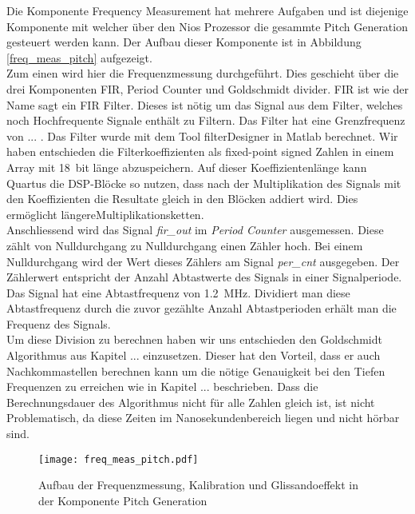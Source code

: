 Die Komponente Frequency Measurement hat mehrere Aufgaben und ist diejenige Komponente mit welcher über den Nios Prozessor die gesammte Pitch Generation gesteuert werden kann. Der Aufbau dieser Komponente ist in Abbildung \ref{freq_meas_pitch} aufgezeigt.\\
Zum einen wird hier die Frequenzmessung durchgeführt. Dies geschieht über die drei Komponenten FIR, Period Counter und Goldschmidt divider. FIR ist wie der Name sagt ein FIR Filter. Dieses ist nötig um das Signal aus dem Filter, welches noch Hochfrequente Signale enthält zu Filtern. Das Filter hat eine Grenzfrequenz von ... . Das Filter wurde mit dem Tool filterDesigner in Matlab berechnet. Wir haben entschieden die Filterkoeffizienten als fixed-point signed Zahlen in einem Array mit \SI{18}{bit} länge abzuspeichern. Auf dieser Koeffizientenlänge kann Quartus die DSP-Blöcke so nutzen, dass nach der Multiplikation des Signals mit den Koeffizienten die Resultate gleich in den Blöcken addiert wird. Dies ermöglicht längereMultiplikationsketten.  \\
Anschliessend wird das Signal \textit{fir\_out} im \textit{Period Counter} ausgemessen. Diese zählt von Nulldurchgang zu Nulldurchgang einen Zähler hoch. Bei einem Nulldurchgang wird der Wert dieses Zählers am Signal \textit{per\_cnt} ausgegeben. Der Zählerwert entspricht der Anzahl Abtastwerte des Signals in einer Signalperiode. \\
Das Signal hat eine Abtastfrequenz von \SI{1.2}{MHz}. Dividiert man diese Abtastfrequenz durch die zuvor gezählte Anzahl Abtastperioden erhält man die Frequenz des Signals.\\ Um diese Division zu berechnen haben wir uns entschieden den Goldschmidt Algorithmus aus Kapitel ...  einzusetzen. Dieser hat den Vorteil, dass er auch Nachkommastellen berechnen kann um die nötige Genauigkeit bei den Tiefen Frequenzen zu erreichen wie in Kapitel ...  beschrieben. Dass die Berechnungsdauer des Algorithmus nicht für alle Zahlen gleich ist, ist nicht Problematisch, da diese Zeiten im Nanosekundenbereich liegen und nicht hörbar sind.

\begin{figure}[h!]
	\centering
	\texttt{[image: freq\_meas\_pitch.pdf]}
	\caption{Aufbau der Frequenzmessung, Kalibration und Glissandoeffekt in der Komponente Pitch Generation} 
	\label{img:freq_meas_pitch}
\end{figure}  

